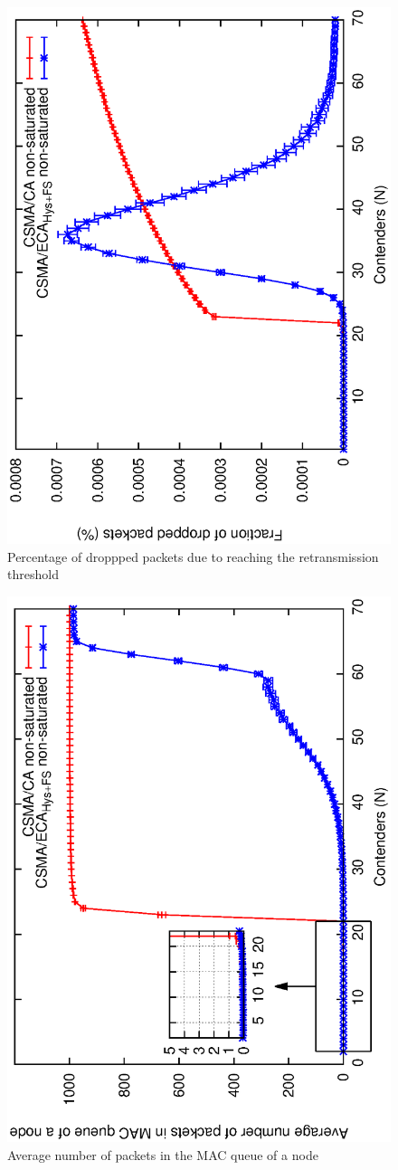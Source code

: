 \documentclass[a4paper,journal]{IEEEtran}
\begin{document}
   	\begin{figure}[tb]
		\centering
		\includegraphics[width=0.7\linewidth,angle=-90]{figures/unsaturated/droppedPackets/droppedPacketsDueRET.eps}
		\caption{Percentage of droppped packets due to reaching the retransmission threshold}
		\label{fig:droppedDueToRET}
	\end{figure}
	
	 \begin{figure}[tb]
		\centering
		\includegraphics[width=0.7\linewidth,angle=-90]{figures/unsaturated/queueSize/queueSize-multiplot.eps}
		\caption{Average number of packets in the MAC queue of a node}
		\label{fig:MacQ}
	\end{figure}
	
\end{document}
